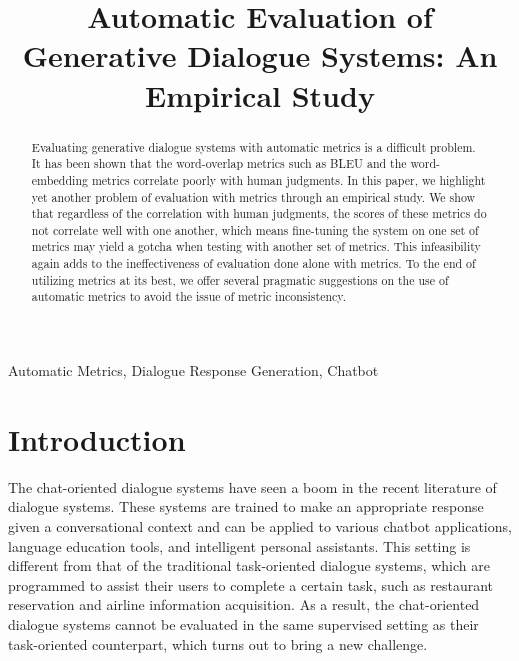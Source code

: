 \documentclass[conference]{IEEEtran}
\begin{document}
\title{Automatic Evaluation of Generative Dialogue Systems: An Empirical Study}

\author{
{}
}

\maketitle

\begin{abstract}
	Evaluating generative dialogue systems with automatic metrics is a difficult problem. It has been shown that the word-overlap metrics such as BLEU and the word-embedding metrics correlate poorly with human judgments. In this paper, we highlight yet another problem of evaluation with metrics through an empirical study. We show that regardless of the correlation with human judgments, the scores of these metrics do not correlate well with one another, which means fine-tuning the system on one set of metrics may yield a gotcha when testing with another set of metrics. This infeasibility again adds to the ineffectiveness of evaluation done alone with metrics. To the end of utilizing metrics at its best, we offer several pragmatic suggestions on the use of automatic metrics to avoid the issue of metric inconsistency.
\end{abstract}

\begin{IEEEkeywords}
Automatic Metrics, Dialogue Response Generation, Chatbot
\end{IEEEkeywords}

\section{Introduction}

    The chat-oriented dialogue systems have seen a boom in the recent literature of dialogue systems. These systems are trained to make an appropriate response given a conversational context and can be applied to various chatbot applications, language education tools, and intelligent personal assistants. This setting is different from that of the traditional task-oriented dialogue systems, which are programmed to assist their users to complete a certain task, such as restaurant reservation and airline information acquisition. As a result, the chat-oriented dialogue systems cannot be evaluated in the same supervised setting as their task-oriented counterpart, which turns out to bring a new challenge.
\end{document}
